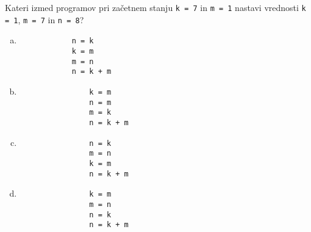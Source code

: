 \documentclass[arhiv, 10pt]{../izpit}
\newcommand{\inlinepy}[1]{\texttt{#1}}
\begin{document}
            
        \naloga*
        
        Kateri izmed programov pri začetnem stanju
            \inlinepy{k = 7} in
            \inlinepy{m = 1}
        nastavi vrednosti
            \inlinepy{k = 1},
            \inlinepy{m = 7} in
            \inlinepy{n = 8}?
    
        \begin{multicols}{4}
        \begin{enumerate}[(a)]
\item 
            \begin{verbatim}
            n = k
            k = m
            m = n
            n = k + m
            \end{verbatim}
        
\item 
                \begin{verbatim}
                k = m
                n = m
                m = k
                n = k + m
                \end{verbatim}
            
\item 
                \begin{verbatim}
                n = k
                m = n
                k = m
                n = k + m
                \end{verbatim}
            
\item 
                \begin{verbatim}
                k = m
                m = n
                n = k
                n = k + m
                \end{verbatim}
            
\end{enumerate}

        \end{multicols}
    
\end{document}
